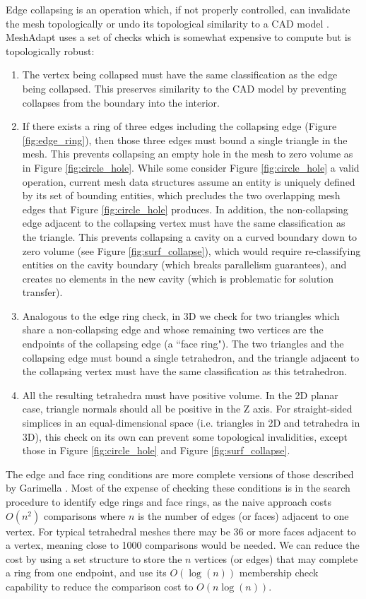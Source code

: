 Edge collapsing is an operation which, if not properly controlled,
can invalidate the mesh topologically or undo its topological similarity
to a CAD model \cite{schroeder1990combined}.
MeshAdapt uses a set of checks which is somewhat expensive to compute
but is topologically robust:

\begin{enumerate}
\item The vertex being collapsed must have the same classification as
the edge being collapsed. This preserves similarity to the CAD model by
preventing collapses from the boundary into the interior.
\item If there exists a ring of three edges including the collapsing edge
(Figure \ref{fig:edge_ring}),
then those three edges must bound a single triangle in the mesh.
This prevents collapsing an empty hole in the mesh to zero volume as in
Figure \ref{fig:circle_hole}.
While some \cite{beall1997general} consider Figure \ref{fig:circle_hole}
a valid operation, current mesh data structures assume an entity is uniquely
defined by its set of bounding entities, which precludes the two overlapping
mesh edges that Figure \ref{fig:circle_hole} produces.
In addition, the non-collapsing edge adjacent to the collapsing vertex must have the same
classification as the triangle.
This prevents collapsing a cavity on a curved boundary down to zero volume
(see Figure \ref{fig:surf_collapse}), which would require re-classifying
entities on the cavity boundary (which breaks parallelism guarantees), and
creates no elements in the new cavity (which is problematic for solution transfer).
\item Analogous to the edge ring check, in 3D we check for two triangles which
share a non-collapsing edge and whose remaining two vertices are the endpoints
of the collapsing edge (a ``face ring").
The two triangles and the collapsing edge must bound a single tetrahedron,
and the triangle adjacent to the collapsing vertex must have the same classification
as this tetrahedron.
\item All the resulting tetrahedra must have positive volume.
In the 2D planar case, triangle normals should all be positive in the Z axis.
For straight-sided simplices in an equal-dimensional space (i.e. triangles in 2D
and tetrahedra in 3D), this check on its own can prevent some topological invalidities,
except those in Figure \ref{fig:circle_hole} and Figure \ref{fig:surf_collapse}.
\end{enumerate}

The edge and face ring conditions are more complete versions of those described
by Garimella \cite{garimella1999anisotropic}.
Most of the expense of checking these conditions is in the search procedure
to identify edge rings and face rings, as the naive approach costs $O(n^2)$
comparisons where $n$ is the number of edges (or faces) adjacent to one vertex.
For typical tetrahedral meshes there may be 36 or more faces adjacent to a vertex,
meaning close to 1000 comparisons would be needed.
We can reduce the cost by using a set structure to store the $n$ vertices (or edges)
that may complete a ring from one endpoint, and use its $O(\log(n))$ membership check
capability to reduce the comparison cost to $O(n\log(n))$.

